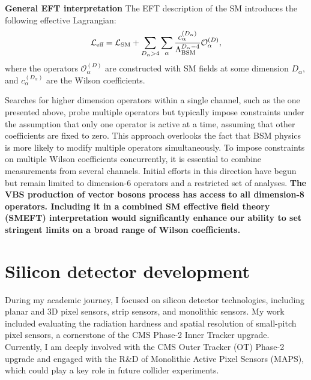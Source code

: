 {\begin{flushleft}
\textbf{General EFT interpretation} 
The EFT description of the SM introduces the following effective Lagrangian:
\begin{equation}
    \mathcal{L}_{\text{eff}} = \mathcal{L}_{\text{SM}} + \sum_{D_\alpha>4}\sum_{\alpha}\dfrac{c_\alpha^{(D_\alpha)}}{\Lambda_{\text{BSM}}^{D_\alpha-4}}\mathcal{O}^{(D)}_\alpha \space,
\end{equation}
where the operators $\mathcal{O}_\alpha^{(D)}$ are constructed with SM fields at some dimension $D_\alpha$, and $c_\alpha^{(D_\alpha)}$ are the Wilson coefficients.

Searches for higher dimension operators within a single channel, such as the one presented above, probe multiple operators but typically impose constraints under the assumption that only one operator is active at a time, assuming that other coefficients are fixed to zero. This approach overlooks the fact that BSM physics is more likely to modify multiple operators simultaneously. To impose constraints on multiple Wilson coefficients concurrently, it is essential to combine measurements from several channels. Initial efforts in this direction have begun~\cite{[5]} but remain limited to dimension-6 operators and a restricted set of analyses. {\bf The VBS production of vector bosons process has access to all dimension-8 operators. Including it in a combined SM effective field theory (SMEFT) interpretation would significantly enhance our ability to set stringent limits on a broad range of Wilson coefficients.}



\vskip 5pt
\section{Silicon detector development}
During my academic journey, I focused on silicon detector technologies, including planar and 3D pixel sensors, strip sensors, and monolithic sensors. My work included evaluating the radiation hardness and spatial resolution of small-pitch pixel sensors, a cornerstone of the CMS Phase-2 Inner Tracker upgrade. Currently, I am deeply involved with the CMS Outer Tracker  (OT) Phase-2 upgrade and engaged with the R\&D of Monolithic Active Pixel Sensors (MAPS), which could play a key role in future collider experiments.

\end{flushleft}}
